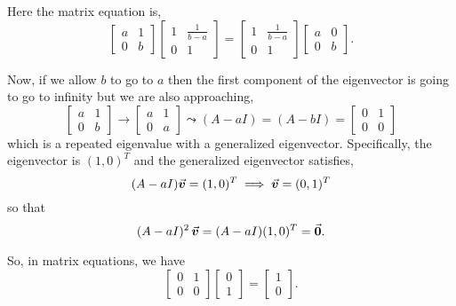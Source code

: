 \documentclass[../MathsNotesBase.tex]{subfiles}
\begin{document}
{		Here the matrix equation is,
		\[ 
		\begin{bmatrix}
			a & 1\\
			0 & b
		\end{bmatrix}
		\begin{bmatrix}
			1 & \frac{1}{b-a}\\
			0 & 1
		\end{bmatrix} =
		\begin{bmatrix}
			1 & \frac{1}{b-a}\\
			0 & 1
		\end{bmatrix}
		\begin{bmatrix}
			a & 0\\
			0 & b
		\end{bmatrix}.
		\]
		
		\bigskip
		Now, if we allow $b$ to go to $a$ then the first component of the eigenvector is going to go to infinity but we are also approaching,
		\[ 
		\begin{bmatrix}
			a & 1\\
			0 & b
		\end{bmatrix} \to
		\begin{bmatrix}
			a & 1\\
			0 & a
		\end{bmatrix} \leadsto
		(A - aI) = (A - bI) =
		\begin{bmatrix}
			0 & 1\\
			0 & 0
		\end{bmatrix}	
		\]
		which is a repeated eigenvalue with a generalized eigenvector. Specifically, the eigenvector is ${ (1,0)^T }$ and the generalized eigenvector satisfies,
		\[
		(A - aI)\vec{\bm{v}} = (1,0)^T \implies \vec{\bm{v}} = (0,1)^T
		\]
		so that 
		\[ (A - aI)^2 \, \vec{\bm{v}} = (A - aI) (1,0)^T = \vec{\bm{0}}. \]
		
		So, in matrix equations, we have
		\[ 
		\begin{bmatrix}
			0 & 1\\
			0 & 0
		\end{bmatrix}\begin{bmatrix}0\\ 1\end{bmatrix} = \begin{bmatrix}1\\ 0\end{bmatrix}.
		\]
		
}
\end{document}
